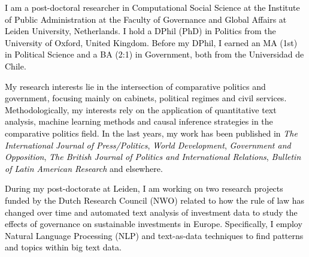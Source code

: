 




\vspace{3mm}

\begin{cvparagraph}

\textcolor{black}{I am a post-doctoral researcher in Computational Social Science at the Institute of Public Administration at the Faculty of Governance and Global Affairs at Leiden University, Netherlands. I hold a DPhil (PhD) in Politics from the University of Oxford, United Kingdom. Before my DPhil, I earned an MA (1st) in Political Science and a BA (2:1) in Government, both from the Universidad de Chile.}

\textcolor{black}{My research interests lie in the intersection of comparative politics and government, focusing mainly on cabinets, political regimes and civil services. Methodologically, my interests rely on the application of quantitative text analysis, machine learning methods and causal inference strategies in the comparative politics field. In the last years, my work has been published in {\itshape The International Journal of Press/Politics}, {\itshape World Development}, {\itshape Government and Opposition}, {\itshape The British Journal of Politics and International Relations}, {\itshape Bulletin of Latin American Research} and elsewhere.}

\textcolor{black}{During my post-doctorate at Leiden, I am working on two research projects funded by the Dutch Research Council (NWO) related to how the rule of law has changed over time and automated text analysis of investment data to study the effects of governance on sustainable investments in Europe. Specifically, I employ Natural Language Processing (NLP) and text-as-data techniques to find patterns and topics within big text data.}
\vspace{1mm}
\end{cvparagraph}
